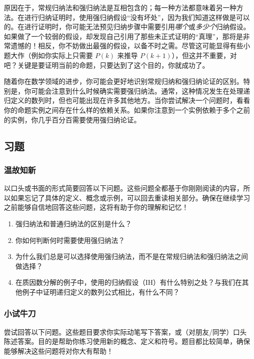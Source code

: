 原因在于，常规归纳法和强归纳法是互相包含的；每一种方法都意味着另一种方法。在进行归纳证明时，使用强归纳假设``没有坏处''，因为我们知道这样做是可以的。在进行证明时，你可能无法预见归纳步骤中需要引用\emph{哪个}或\emph{多少个}归纳假设。如果做了一个较弱的假设，却发现自己引用了那些未正式证明的``真理''，那将是非常遗憾的！相反，你不妨做出最强的假设，以备不时之需。尽管这可能显得有些小题大作（例如你实际上只需要 $P(k)$ 来推导 $P(k+1)$），但这并不重要，对吧？关键是要证明当前的命题，只要达到了这个目的，你就成功了。

随着你在数学领域的进步，你可能会更好地识别常规归纳和强归纳论证的区别。特别是，你可能会注意到什么时候确实需要强归纳法。通常，这种情况发生在处理递归定义的数列时，但也可能出现在许多其他地方。当你尝试解决一个问题时，看看你的命题实例之间存在什么样的依赖关系。如果你注意到一个实例依赖于多个之前的实例，你几乎百分百需要使用强归纳论证。

\subsection{习题}

\subsubsection*{温故知新}

以口头或书面的形式简要回答以下问题。这些问题全都基于你刚刚阅读的内容，所以如果忘记了具体的定义、概念或示例，可以回去重读相关部分。确保在继续学习之前能够自信地回答这些问题，这将有助于你的理解和记忆！

\begin{enumerate}[label=(\arabic*)]
    \item 强归纳法和普通归纳法的区别是什么？
    \item 你如何判断何时需要使用强归纳法？
    \item 为什么我们总是可以选择使用强归纳法，而不是在常规归纳法和强归纳法之间做选择？
    \item 在质因数分解的例子中，使用的归纳假设（IH）有什么特别之处？与我们在其他例子中证明递归定义的数列公式相比，有什么不同？
\end{enumerate}

\subsubsection*{小试牛刀}

尝试回答以下问题。这些题目要求你实际动笔写下答案，或（对朋友/同学）口头陈述答案。目的是帮助你练习使用新的概念、定义和符号。题目都比较简单，确保能够解决这些问题将对你大有帮助！

